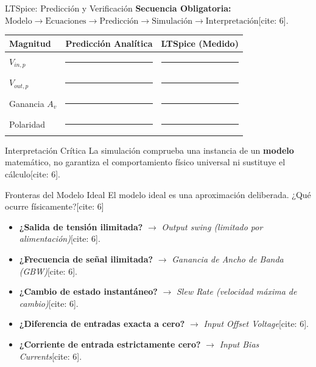 \documentclass[aspectratio=169, table, xcdraw]{beamer}
\begin{document}
\begin{frame}{LTSpice: Predicción y Verificación}
    {\small \textbf{Secuencia Obligatoria:} $\text{Modelo} \rightarrow \text{Ecuaciones} \rightarrow \text{Predicción} \rightarrow \text{Simulación} \rightarrow \text{Interpretación}$[cite: 6].}
    
    \vspace{0.3cm}
    \begin{table}[]
        \centering
        \renewcommand{\arraystretch}{1.3}
        \begin{tabular}{l c c}
        \toprule
        \rowcolor[HTML]{EFEFEF}
        \textbf{Magnitud} & \textbf{Predicción Analítica} & \textbf{LTSpice (Medido)} \\ \midrule
        $V_{in,p}$ & \rule{2cm}{0.4pt} & \rule{2cm}{0.4pt} \\
        $V_{out,p}$ & \rule{2cm}{0.4pt} & \rule{2cm}{0.4pt} \\
        Ganancia $A_v$ & \rule{2cm}{0.4pt} & \rule{2cm}{0.4pt} \\
        Polaridad & \rule{2cm}{0.4pt} & \rule{2cm}{0.4pt} \\
        \bottomrule
        \end{tabular}
    \end{table}

    \begin{alertblock}{Interpretación Crítica}
        La simulación comprueba una instancia de un \textbf{modelo} matemático, no garantiza el comportamiento físico universal ni sustituye el cálculo[cite: 6].
    \end{alertblock}
\end{frame}

\begin{frame}{Fronteras del Modelo Ideal}
    El modelo ideal es una aproximación deliberada. ¿Qué ocurre físicamente?[cite: 6]
    
    \begin{itemize}
        \item \textbf{¿Salida de tensión ilimitada?} $\rightarrow$ \textit{Output swing (limitado por alimentación)}[cite: 6].
        \item \textbf{¿Frecuencia de señal ilimitada?} $\rightarrow$ \textit{Ganancia de Ancho de Banda (GBW)}[cite: 6].
        \item \textbf{¿Cambio de estado instantáneo?} $\rightarrow$ \textit{Slew Rate (velocidad máxima de cambio)}[cite: 6].
        \item \textbf{¿Diferencia de entradas exacta a cero?} $\rightarrow$ \textit{Input Offset Voltage}[cite: 6].
        \item \textbf{¿Corriente de entrada estrictamente cero?} $\rightarrow$ \textit{Input Bias Currents}[cite: 6].
    \end{itemize}
\end{frame}
\end{document}
